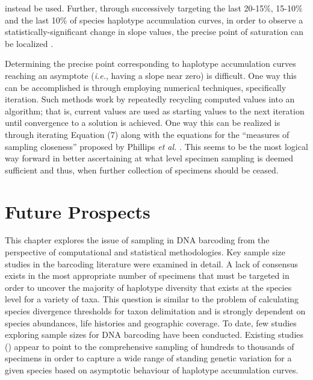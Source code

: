 instead be used. Further, through successively targeting the last 20-15\%, 15-10\% and the last 10\% of species haplotype accumulation curves, in order to observe a statistically-significant change in slope values, the precise point of saturation can be localized \cite{phillips2015exploration}.

\vspace{5mm} 

Determining the precise point corresponding to haplotype accumulation curves \\ reaching an asymptote (\textit{i.e.}, having a slope near zero) is difficult. One way this can be accomplished is through employing numerical techniques, specifically iteration. Such methods work by repeatedly recycling computed values into an algorithm; that is, current values are used as starting values to the next iteration until convergence to a solution is achieved. One way this can be realized is through iterating Equation (7) along with the equations for the ``measures of sampling closeness'' proposed by Phillips \textit{et al.} \cite{phillips2015exploration}. This seems to be the most logical way forward in better ascertaining at what level specimen sampling is deemed sufficient and thus, when further collection of specimens should be ceased.

\vspace{5mm}

\section{Future Prospects}

This chapter explores the issue of sampling in DNA barcoding from the \\ perspective of computational and statistical methodologies. Key sample size studies in the barcoding literature were examined in detail. A lack of consensus exists in the most appropriate number of specimens that must be targeted in order to uncover the majority of haplotype diversity that exists at the species level for a variety of taxa. This question is similar to the problem of calculating species divergence thresholds for taxon delimitation and is strongly dependent on species abundances, life histories and geographic coverage. To date, few studies exploring sample sizes for DNA barcoding have been conducted. Existing studies (\cite{phillips2015exploration, zhang2010estimating}) appear to point to the comprehensive sampling of hundreds to thousands of specimens in order to capture a wide range of standing genetic variation for a given species based on asymptotic behaviour of haplotype accumulation curves.


